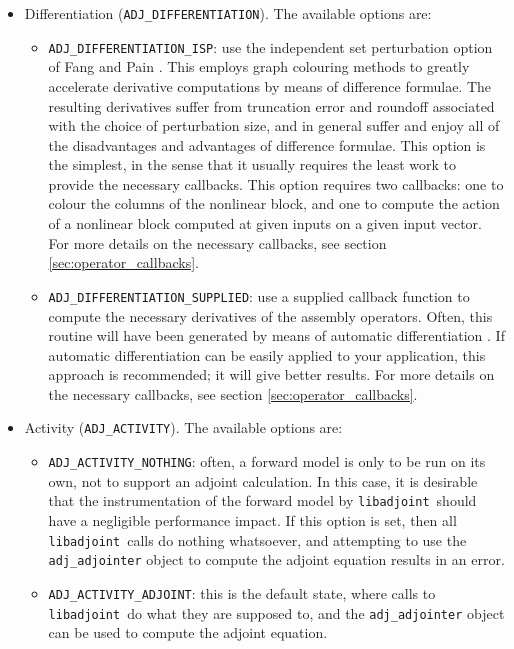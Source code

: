 \documentclass[10pt,authoryear]{elsarticle}
\newcommand{\libadjoint}[0]{{\texttt{libadjoint}}}
\begin{document}
\begin{itemize}
\item Differentiation (\texttt{ADJ\_DIFFERENTIATION}). The available options are:
  \begin{itemize}
  \item \texttt{ADJ\_DIFFERENTIATION\_ISP}: use the independent set perturbation option of Fang and Pain \citep{fang2009a}. This employs
  graph colouring methods to greatly accelerate derivative computations by means of difference formulae. The resulting derivatives suffer
  from truncation error and roundoff associated with the choice of perturbation size, and in general suffer and enjoy all of the disadvantages
  and advantages of difference formulae. This option is the simplest, in the sense that it usually requires the least work to provide
  the necessary callbacks. This option requires two callbacks: one to colour the columns of the nonlinear block, and one to
  compute the action of a nonlinear block computed at given inputs on a given input vector. For more details on the necessary callbacks, see section \ref{sec:operator_callbacks}.
  \item \texttt{ADJ\_DIFFERENTIATION\_SUPPLIED}: use a supplied callback function to compute the necessary derivatives of the assembly
  operators. Often, this routine will have been generated by means of automatic differentiation \citep{griewank2008,griewank2003}. If automatic differentiation
  can be easily applied to your application, this approach is recommended; it will give better results. For more details on the necessary callbacks, see section \ref{sec:operator_callbacks}.
  \end{itemize}

\item Activity (\texttt{ADJ\_ACTIVITY}). The available options are:
  \begin{itemize}
  \item \texttt{ADJ\_ACTIVITY\_NOTHING}: often, a forward model is only to be run on its own, not to support an adjoint calculation.
  In this case, it is desirable that the instrumentation of the forward model by \libadjoint\ should have a negligible performance impact.
  If this option is set, then all \libadjoint\ calls do nothing whatsoever, and attempting to use the \texttt{adj\_adjointer} object to compute
  the adjoint equation results in an error.
  \item \texttt{ADJ\_ACTIVITY\_ADJOINT}: this is the default state, where calls to \libadjoint\ do what they are supposed to, and the
  \texttt{adj\_adjointer} object can be used to compute the adjoint equation.
  \end{itemize}

\end{itemize}
\end{document}
